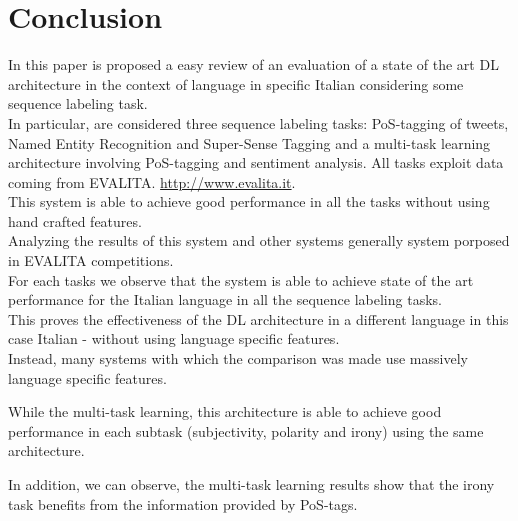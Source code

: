 \documentclass[twocolumn,10pt]{wmrDoc}
\begin{document}




\section{Conclusion}
In this paper is proposed a easy review of an evaluation of a state of the art DL architecture in the context of language in specific Italian considering some sequence labeling task.\\
In particular, are considered three sequence labeling tasks: PoS-tagging of tweets, Named Entity Recognition and Super-Sense Tagging  and a multi-task learning architecture involving PoS-tagging and sentiment analysis. 
All tasks exploit data coming from EVALITA. \url{http://www.evalita.it}.\\
This system is able to achieve good performance in all the tasks without using hand crafted features. \\
 
Analyzing the results of this system and other systems generally system porposed in EVALITA competitions.\\
 For each tasks we observe that the system is able to achieve state of the art performance for the Italian language in all the sequence labeling tasks.\\
This proves the effectiveness of the DL architecture in a different language in this case Italian - without using language specific features.\\
Instead, many systems with which the comparison was made use massively language specific features.

While the multi-task learning, this architecture is able to achieve good performance in each subtask (subjectivity, polarity and irony) using the same architecture.

In addition, we can observe, the multi-task learning results show that the irony task benefits from the information provided by PoS-tags. \\
\end{document}
